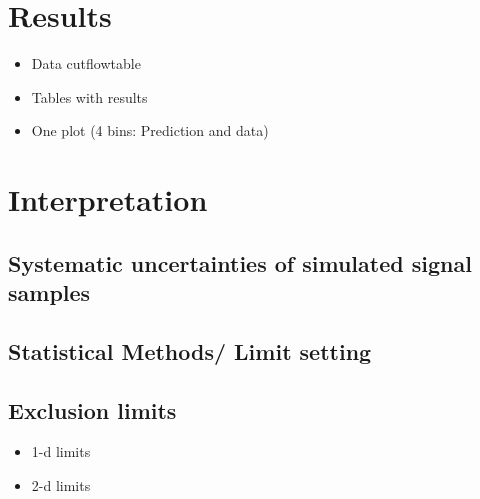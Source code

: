 \chapter{Results}
\label{sec:Results}
\begin{itemize}
\item Data cutflowtable
\item Tables with results
\item One plot (4 bins: Prediction and data)
\end{itemize}

\chapter{Interpretation}
\label{sec:Interpretation}
\section{Systematic uncertainties of simulated signal samples}
\section{Statistical Methods/ Limit setting}
\section{Exclusion limits}
\begin{itemize}
\item 1-d limits
\item 2-d limits
\end{itemize}

